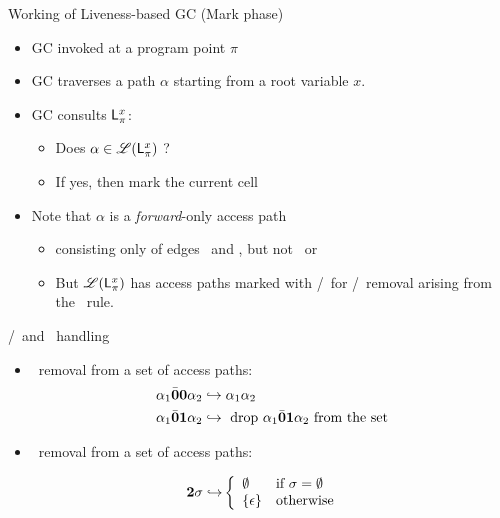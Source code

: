 \documentclass[xcolor=x11names,compress,mathserif]{beamer}
\renewcommand{\(}{\begin{columns}}
\renewcommand{\)}{\end{columns}}
\newcommand{\<}[1]{\begin{column}{#1}}
\renewcommand{\>}{\end{column}}
\begin{document}
\begin{frame}{Working of Liveness-based GC (Mark phase)}
  \begin{itemize}
  \item GC invoked at a program point $\pi$
  \item GC traverses a path $\alpha$ starting from a root variable $x$.
  \item GC consults $\mathsf{L}_{{\pi}}^{x}$: 
    \begin{itemize}
    \item Does $\alpha \in \mathscr{L}(\mathsf{L}_{{\pi}}^{x})$ ?
    \item If yes, then mark the current cell
    \end{itemize}
    \pause
  \item  Note  that  $\alpha$  is a  {\em  forward}-only  access  path
    \begin{itemize}
    \item consisting  only of  edges \acar\  and \acdr,  but not  \bcar\ or
      \bcdr
    \item But $\mathscr{L}(\mathsf{L}_{{\pi}}^{x})$ has access paths marked with \bcar/\bcdr\ for \acar/\acdr\  removal
  arising from the \CONS\  rule.
    \end{itemize}
  \end{itemize}
\end{frame}
\begin{frame}{\bcar/\bcdr\  and \clazy\ handling}

\begin{itemize}
\item \acar\   removal from a set of access paths:
  \begin{align*}
    \alpha_1\bar{\mathbf{0}}\mathbf{0}\alpha_2 &\hookrightarrow
    \alpha_1\alpha_2\\
    \alpha_1\bar{\mathbf{0}} \mathbf{1}\alpha_2 &\hookrightarrow
    \mbox{ drop $\alpha_1\bar{\mathbf{0}} \mathbf{1} \alpha_2$ from the set}
  \end{align*}
\item \clazy\   removal from a set of access paths:

  \begin{align*}
    {\mathbf{2}}\sigma \hookrightarrow & \left\{ 
    \begin{array}{ll}
      \emptyset&\mbox{if}~\sigma = \emptyset\\
      \{\epsilon\} & \mbox{otherwise}
    \end{array}\right.
  \end{align*}
\end{itemize}

\end{frame}
\end{document}
